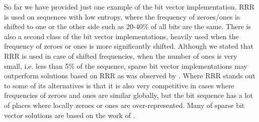 So far we have provided just one example of the bit vector implementation.
RRR is used on sequences with low entropy, where the frequency of zeroes/ones
is shifted to one or the other side such as 20-40\% of all bits are the same.
There is also a second class of the bit vector implementations, heavily
used when the frequency of zeroes or ones is more significantly shifted.
Although we stated that RRR is used in case of shifted frequencies, when the number
of ones is very small, i.e. less than 5\% of the sequence, sparse bit vector
implementations may outperform solutions based on RRR as was observed by \cite{navarro2012fast}.
Where RRR stands out to some of its alternatives is that it is also very competitive
in cases where frequencies of zeroes and ones are similar globally, but the bit
sequence has a lot of places where locally zeroes or ones are over-represented.
Many of sparse bit vector solutions are based on the work of \cite{okanohara2007practical}.